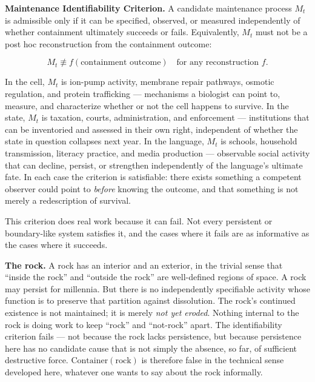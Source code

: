 \documentclass[11pt]{article}
\theoremstyle{plain}
\begin{document}
\textbf{Maintenance Identifiability Criterion.} A candidate maintenance process \(M_t\) is admissible only if it can be specified, observed, or measured independently of whether containment ultimately succeeds or fails. Equivalently, \(M_t\) must not be a post hoc reconstruction from the containment outcome:

\[M_t \not\equiv f(\text{containment outcome}) \quad \text{for any reconstruction } f.\]

In the cell, \(M_t\) is ion-pump activity, membrane repair pathways, osmotic regulation, and protein trafficking --- mechanisms a biologist can point to, measure, and characterize whether or not the cell happens to survive. In the state, \(M_t\) is taxation, courts, administration, and enforcement --- institutions that can be inventoried and assessed in their own right, independent of whether the state in question collapses next year. In the language, \(M_t\) is schools, household transmission, literacy practice, and media production --- observable social activity that can decline, persist, or strengthen independently of the language's ultimate fate. In each case the criterion is satisfiable: there exists something a competent observer could point to \emph{before} knowing the outcome, and that something is not merely a redescription of survival.

This criterion does real work because it can fail. Not every persistent or boundary-like system satisfies it, and the cases where it fails are as informative as the cases where it succeeds.

\textbf{The rock.} A rock has an interior and an exterior, in the trivial sense that ``inside the rock'' and ``outside the rock'' are well-defined regions of space. A rock may persist for millennia. But there is no independently specifiable activity whose function is to preserve that partition against dissolution. The rock's continued existence is not maintained; it is merely \emph{not yet eroded}. Nothing internal to the rock is doing work to keep ``rock'' and ``not-rock'' apart. The identifiability criterion fails --- not because the rock lacks persistence, but because persistence here has no candidate cause that is not simply the absence, so far, of sufficient destructive force. \(\mathrm{Container}(\text{rock})\) is therefore false in the technical sense developed here, whatever one wants to say about the rock informally.
\end{document}
